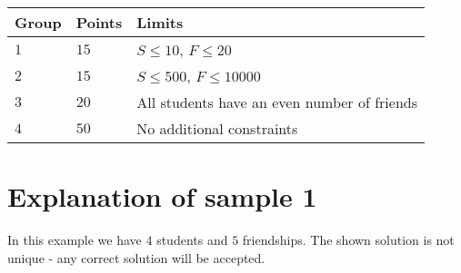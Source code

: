 \noindent
\begin{tabular}{| l | l | p{12cm} |}
  \hline
  Group & Points & Limits \\ \hline
  $1$    & $15$       &  $S \leq 10$, $F \leq 20$  \\ \hline 
  $2$    & $15$       &  $S \leq 500$, $F \leq 10000$ \\ \hline
  $3$    & $20$       &  All students have an even number of friends \\ \hline
  $4$    & $50$       &  No additional constraints \\ \hline
\end{tabular}

\section*{Explanation of sample 1}
\noindent
In this example we have $4$ students and $5$ friendships. The shown solution is not unique - any
correct solution will be accepted.
